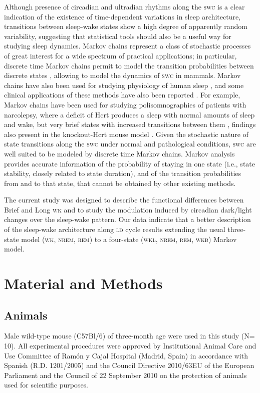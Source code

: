\documentclass[10pt,letterpaper]{article}
\def\REM/{\textsc{rem}}
\def\NREM/{\textsc{nrem}}
\def\WK/{\textsc{wk}}
\def\WKL/{\textsc{wkl}}
\def\WKB/{\textsc{wkb}}
\def\SWC/{\textsc{swc}}
\def\LD/{\textsc{ld}}
\begin{document}
Although presence of  circadian and ultradian rhythms along the  \SWC/ is a clear indication of the existence of time-dependent variations in sleep architecture, transitions between sleep-wake states show a high degree of apparently random variability, suggesting that  statistical tools should also be a useful way for studying sleep dynamics. Markov chains represent a class of stochastic processes of great interest for a wide spectrum of practical applications; in particular, discrete time Markov chains permit to model the transition probabilities between discrete states \cite{zung1966computer,Kemp1986,Bremaud1999,Spedicato2015}, allowing to model the dynamics of \SWC/ in mammals. Markov chains have also been used for studying physiology of human sleep \cite{Kemp1986}, and some clinical applications of these methods have also been reported \cite{Kim2009,Ferri2016,Bianchi2012,wei2017sleep}. For example, Markov chains have been used for studying  polisomnographies  of patients with narcolepsy, where a deficit of Hcrt produces a sleep with normal amounts of sleep and wake, but very brief states with increased transitions between them \cite{Ferri2016}, findings also present in  the knockout-Hcrt mouse model  \cite{Mochizuki2004}. Given the stochastic nature of state transitions along the \SWC/ under normal and pathological conditions, \SWC/ are well suited to be modeled by discrete time Markov chains. Markov analysis provides accurate information of the probability of staying in one state (i.e., state stability, closely related to state duration), and of the transition probabilities from and to that state, that cannot be obtained by other existing methods. 



The current study was designed to describe the functional  differences between Brief and Long \WK/ and  to study the  modulation induced by circadian dark/light changes over the sleep-wake pattern. Our data indicate that a better description of the sleep-wake architecture along \LD/ cycle results extending the usual three-state model (\WK/,  \NREM/, \REM/) to  a four-state (\WKL/,  \NREM/, \REM/, \WKB/) Markov model.


\section{Material and Methods}

\subsection{Animals}
Male wild-type mouse (C57Bl/6) of three-month age were used in this study (N= 10). All experimental procedures were approved by Institutional Animal Care and Use Committee of Ram\'on y Cajal Hospital (Madrid, Spain) in accordance with Spanish (R.D. 1201/2005) and the Council Directive
2010/63EU of the European Parliament and the Council of 22 September
2010 on the protection of animals used for scientific purposes. 
\end{document}
